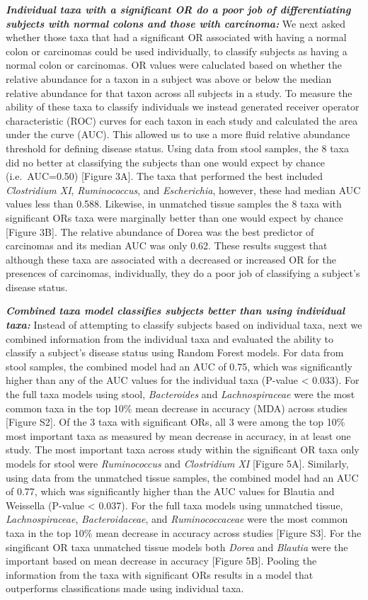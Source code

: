 \documentclass[12pt,]{article}
\begin{document}
\textbf{\emph{Individual taxa with a significant OR do a poor job of
differentiating subjects with normal colons and those with carcinoma:}}
We next asked whether those taxa that had a significant OR associated
with having a normal colon or carcinomas could be used individually, to
classify subjects as having a normal colon or carcinomas. OR values were
caluclated based on whether the relative abundance for a taxon in a
subject was above or below the median relative abundance for that taxon
across all subjects in a study. To measure the ability of these taxa to
classify individuals we instead generated receiver operator
characteristic (ROC) curves for each taxon in each study and calculated
the area under the curve (AUC). This allowed us to use a more fluid
relative abundance threshold for defining disease status. Using data
from stool samples, the 8 taxa did no better at classifying the subjects
than one would expect by chance (i.e.~AUC=0.50) {[}Figure 3A{]}. The
taxa that performed the best included \emph{Clostridium XI},
\emph{Ruminococcus}, and \emph{Escherichia}, however, these had median
AUC values less than 0.588. Likewise, in unmatched tissue samples the 8
taxa with significant ORs taxa were marginally better than one would
expect by chance {[}Figure 3B{]}. The relative abundance of Dorea was
the best predictor of carcinomas and its median AUC was only 0.62. These
results suggest that although these taxa are associated with a decreased
or increased OR for the presences of carcinomas, individually, they do a
poor job of classifying a subject's disease status.

\textbf{\emph{Combined taxa model classifies subjects better than using
individual taxa:}} Instead of attempting to classify subjects based on
individual taxa, next we combined information from the individual taxa
and evaluated the ability to classify a subject's disease status using
Random Forest models. For data from stool samples, the combined model
had an AUC of 0.75, which was significantly higher than any of the AUC
values for the individual taxa (P-value \textless{} 0.033). For the full
taxa models using stool, \emph{Bacteroides} and \emph{Lachnospiraceae}
were the most common taxa in the top 10\% mean decrease in accuracy
(MDA) across studies {[}Figure S2{]}. Of the 3 taxa with significant
ORs, all 3 were among the top 10\% most important taxa as measured by
mean decrease in accuracy, in at least one study. The most important
taxa across study within the significant OR taxa only models for stool
were \emph{Ruminococcus} and \emph{Clostridium XI} {[}Figure 5A{]}.
Similarly, using data from the unmatched tissue samples, the combined
model had an AUC of 0.77, which was significantly higher than the AUC
values for Blautia and Weissella (P-value \textless{} 0.037). For the
full taxa models using unmatched tissue, \emph{Lachnospiraceae},
\emph{Bacteroidaceae}, and \emph{Ruminococcaceae} were the most common
taxa in the top 10\% mean decrease in accuracy across studies {[}Figure
S3{]}. For the singificant OR taxa unmatched tissue models both
\emph{Dorea} and \emph{Blautia} were the important based on mean
decrease in accuracy {[}Figure 5B{]}. Pooling the information from the
taxa with significant ORs results in a model that outperforms
classifications made using individual taxa.
\end{document}
